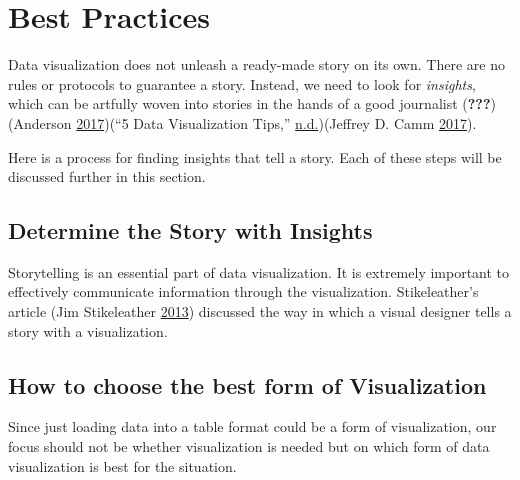 \documentclass[]{book}
\begin{document}
\hypertarget{best-practices}{%
\section{Best Practices}\label{best-practices}}

Data visualization does not unleash a ready-made story on its own. There are no rules or protocols to guarantee a story. Instead, we need to look for \emph{insights}, which can be artfully woven into stories in the hands of a good journalist ({\textbf{???}})(Anderson \protect\hyperlink{ref-design_principles}{2017})(``5 Data Visualization Tips,'' \protect\hyperlink{ref-DataVizTips}{n.d.})(Jeffrey D. Camm \protect\hyperlink{ref-practitioners_guide}{2017}).

Here is a process for finding insights that tell a story. Each of these steps will be discussed further in this section.

\hypertarget{determine-the-story-with-insights}{%
\subsection{Determine the Story with Insights}\label{determine-the-story-with-insights}}

Storytelling is an essential part of data visualization. It is extremely important to effectively communicate information through the visualization. Stikeleather's article (Jim Stikeleather \protect\hyperlink{ref-storytelling_with_data}{2013}) discussed the way in which a visual designer tells a story with a visualization.

\hypertarget{how-to-choose-the-best-form-of-visualization}{%
\subsection{How to choose the best form of Visualization}\label{how-to-choose-the-best-form-of-visualization}}

Since just loading data into a table format could be a form of visualization, our focus should not be whether visualization is needed but on which form of data visualization is best for the situation.
\end{document}
